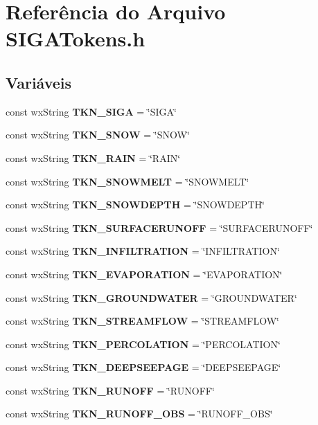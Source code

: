 \section{Referência do Arquivo S\+I\+G\+A\+Tokens.\+h}
\label{_s_i_g_a_tokens_8h}
\subsection*{Variáveis}
\begin{DoxyCompactItemize}
\item 
const wx\+String {\bf T\+K\+N\+\_\+\+S\+I\+GA} = \char`\"{}S\+I\+GA\char`\"{}
\item 
const wx\+String {\bf T\+K\+N\+\_\+\+S\+N\+OW} = \char`\"{}S\+N\+OW\char`\"{}
\item 
const wx\+String {\bf T\+K\+N\+\_\+\+R\+A\+IN} = \char`\"{}R\+A\+IN\char`\"{}
\item 
const wx\+String {\bf T\+K\+N\+\_\+\+S\+N\+O\+W\+M\+E\+LT} = \char`\"{}S\+N\+O\+W\+M\+E\+LT\char`\"{}
\item 
const wx\+String {\bf T\+K\+N\+\_\+\+S\+N\+O\+W\+D\+E\+P\+TH} = \char`\"{}S\+N\+O\+W\+D\+E\+P\+TH\char`\"{}
\item 
const wx\+String {\bf T\+K\+N\+\_\+\+S\+U\+R\+F\+A\+C\+E\+R\+U\+N\+O\+FF} = \char`\"{}S\+U\+R\+F\+A\+C\+E\+R\+U\+N\+O\+FF\char`\"{}
\item 
const wx\+String {\bf T\+K\+N\+\_\+\+I\+N\+F\+I\+L\+T\+R\+A\+T\+I\+ON} = \char`\"{}I\+N\+F\+I\+L\+T\+R\+A\+T\+I\+ON\char`\"{}
\item 
const wx\+String {\bf T\+K\+N\+\_\+\+E\+V\+A\+P\+O\+R\+A\+T\+I\+ON} = \char`\"{}E\+V\+A\+P\+O\+R\+A\+T\+I\+ON\char`\"{}
\item 
const wx\+String {\bf T\+K\+N\+\_\+\+G\+R\+O\+U\+N\+D\+W\+A\+T\+ER} = \char`\"{}G\+R\+O\+U\+N\+D\+W\+A\+T\+ER\char`\"{}
\item 
const wx\+String {\bf T\+K\+N\+\_\+\+S\+T\+R\+E\+A\+M\+F\+L\+OW} = \char`\"{}S\+T\+R\+E\+A\+M\+F\+L\+OW\char`\"{}
\item 
const wx\+String {\bf T\+K\+N\+\_\+\+P\+E\+R\+C\+O\+L\+A\+T\+I\+ON} = \char`\"{}P\+E\+R\+C\+O\+L\+A\+T\+I\+ON\char`\"{}
\item 
const wx\+String {\bf T\+K\+N\+\_\+\+D\+E\+E\+P\+S\+E\+E\+P\+A\+GE} = \char`\"{}D\+E\+E\+P\+S\+E\+E\+P\+A\+GE\char`\"{}
\item 
const wx\+String {\bf T\+K\+N\+\_\+\+R\+U\+N\+O\+FF} = \char`\"{}R\+U\+N\+O\+FF\char`\"{}
\item 
const wx\+String {\bf T\+K\+N\+\_\+\+R\+U\+N\+O\+F\+F\+\_\+\+O\+BS} = \char`\"{}R\+U\+N\+O\+F\+F\+\_\+\+O\+BS\char`\"{}

\end{DoxyCompactItemize}

